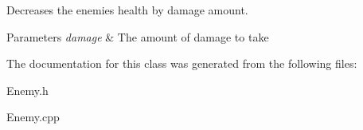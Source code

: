 Decreases the enemies health by damage amount. 


\begin{DoxyParams}{Parameters}
{\em damage} & The amount of damage to take \\
\hline
\end{DoxyParams}


The documentation for this class was generated from the following files\+:\begin{DoxyCompactItemize}
\item 
Enemy.\+h\item 
Enemy.\+cpp\end{DoxyCompactItemize}
